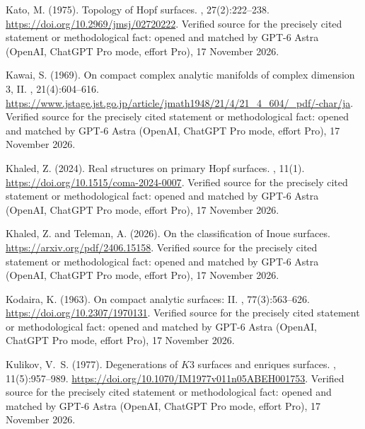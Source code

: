 \begin{thebibliography}{}
Kato, M. (1975).
\newblock Topology of {Hopf} surfaces.
, 27(2):222--238.
\newblock \url{https://doi.org/10.2969/jmsj/02720222}. Verified source for the precisely cited statement or methodological fact: opened and matched by GPT-6 Astra (OpenAI, ChatGPT Pro mode, effort Pro), 17 November 2026.

Kawai, S. (1969).
\newblock On compact complex analytic manifolds of complex dimension 3, {II}.
, 21(4):604--616.
\newblock \url{https://www.jstage.jst.go.jp/article/jmath1948/21/4/21_4_604/_pdf/-char/ja}. Verified source for the precisely cited statement or methodological fact: opened and matched by GPT-6 Astra (OpenAI, ChatGPT Pro mode, effort Pro), 17 November 2026.

Khaled, Z. (2024).
\newblock Real structures on primary {Hopf} surfaces.
, 11(1).
\newblock \url{https://doi.org/10.1515/coma-2024-0007}. Verified source for the precisely cited statement or methodological fact: opened and matched by GPT-6 Astra (OpenAI, ChatGPT Pro mode, effort Pro), 17 November 2026.

Khaled, Z. and Teleman, A. (2026).
\newblock On the classification of {Inoue} surfaces.
\newblock \url{https://arxiv.org/pdf/2406.15158}. Verified source for the precisely cited statement or methodological fact: opened and matched by GPT-6 Astra (OpenAI, ChatGPT Pro mode, effort Pro), 17 November 2026.

Kodaira, K. (1963).
\newblock On compact analytic surfaces: {II}.
, 77(3):563--626.
\newblock \url{https://doi.org/10.2307/1970131}. Verified source for the precisely cited statement or methodological fact: opened and matched by GPT-6 Astra (OpenAI, ChatGPT Pro mode, effort Pro), 17 November 2026.

Kulikov, V.~S. (1977).
\newblock Degenerations of {$K3$} surfaces and enriques surfaces.
, 11(5):957--989.
\newblock \url{https://doi.org/10.1070/IM1977v011n05ABEH001753}. Verified source for the precisely cited statement or methodological fact: opened and matched by GPT-6 Astra (OpenAI, ChatGPT Pro mode, effort Pro), 17 November 2026.


\end{thebibliography}
